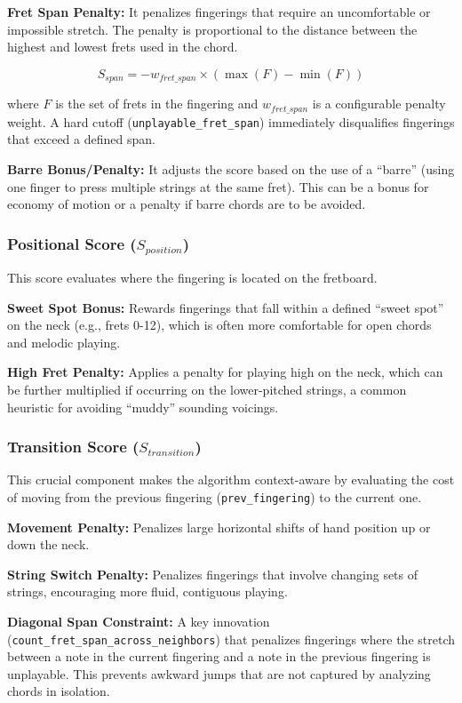 \documentclass[conference]{IEEEtran}
\begin{document}
\textbf{Fret Span Penalty:} It penalizes fingerings that require an uncomfortable or impossible stretch. The penalty is proportional to the distance between the highest and lowest frets used in the chord.

\begin{equation}
S_{span} = -w_{fret\_span} \times (\max(F) - \min(F))
\end{equation}

where $F$ is the set of frets in the fingering and $w_{fret\_span}$ is a configurable penalty weight. A hard cutoff (\texttt{unplayable\_fret\_span}) immediately disqualifies fingerings that exceed a defined span.

\textbf{Barre Bonus/Penalty:} It adjusts the score based on the use of a ``barre'' (using one finger to press multiple strings at the same fret). This can be a bonus for economy of motion or a penalty if barre chords are to be avoided.

\subsubsection{Positional Score ($S_{position}$)}
This score evaluates where the fingering is located on the fretboard.

\textbf{Sweet Spot Bonus:} Rewards fingerings that fall within a defined ``sweet spot'' on the neck (e.g., frets 0-12), which is often more comfortable for open chords and melodic playing.

\textbf{High Fret Penalty:} Applies a penalty for playing high on the neck, which can be further multiplied if occurring on the lower-pitched strings, a common heuristic for avoiding ``muddy'' sounding voicings.

\subsubsection{Transition Score ($S_{transition}$)}
This crucial component makes the algorithm context-aware by evaluating the cost of moving from the previous fingering (\texttt{prev\_fingering}) to the current one.

\textbf{Movement Penalty:} Penalizes large horizontal shifts of hand position up or down the neck.

\textbf{String Switch Penalty:} Penalizes fingerings that involve changing sets of strings, encouraging more fluid, contiguous playing.

\textbf{Diagonal Span Constraint:} A key innovation (\texttt{count\_fret\_span\_across\_neighbors}) that penalizes fingerings where the stretch between a note in the current fingering and a note in the previous fingering is unplayable. This prevents awkward jumps that are not captured by analyzing chords in isolation.
\end{document}
